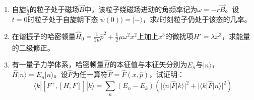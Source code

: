\begin{enumerate}
{}

\newpage
\item 
自旋$\frac{1}{2}$的粒子处于磁场$\vec{B}$中，该粒子绕磁场进动的角频率记为$\omega=-r\vec{B}$。设$t=0$时粒子处于自旋朝下态$|\psi(0)\rangle=|-\rangle$，求$t$时刻粒子仍处于该态的几率。

\banswer{
	
}


\item 
在谐振子的哈密顿量$\hat{H}_0=\frac{1}{2\mu}\hat{p}^2+\frac{1}{2}\mu\omega^2x^2$上加上$x^3$的微扰项$H'=\lambda x^3$，求能量的二级修正。

\banswer{
	
}


\item 
有一量子力学体系，哈密顿量$\hat{H}$的本征值与本征矢分别为$E_n$与$|n\rangle $，
$\hat{H}|n\rangle =E_n|n\rangle $。设$\hat{F}$为任一算符$\hat{F}=\hat{F}(x,\hat{p})$，试证明：
$$\langle  k|[F^+,[H,F]]|k\rangle =\sum_n(E_n-E_k)(|\langle  n|\hat{F}|k\rangle |^2+|\langle  k|\hat{F}|n\rangle |^2)$$

\banswer{
	
}

	
\end{enumerate}

